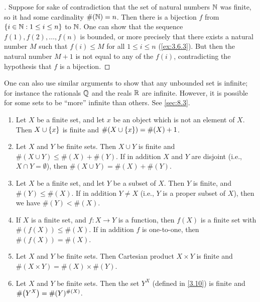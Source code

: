 \begin{proof}[]
	Suppose for sake of contradiction that the set of natural numbers \(\mathbb{N}\) was finite, so it had some cardinality \(\#(\mathbb{N}) = n\).
	Then there is a bijection \(f\) from \(\left\lbrace i \in \mathbb{N} : 1 \leq i \leq n\right\rbrace\) to \(\mathbb{N}\).
	One can show that the sequence \(f(1), f(2), \dots, f(n)\) is bounded, or more precisely that there exists a natural number \(M\) such that \(f(i) \leq M\) for all \(1 \leq i \leq n\) (\cref{ex:3.6.3}).
	But then the natural number \(M+1\) is not equal to any of the \(f(i)\), contradicting the hypothesis that \(f\) is a bijection.
\end{proof}

\begin{rmk}\label{3.6.13}
	One can also use similar arguments to show that any unbounded set is infinite;
	for instance the rationals \(\mathbb{Q}\) and the reals \(\mathbb{R}\) are infinite.
	However, it is possible for some sets to be ``more'' infinite than others.
	See \cref{sec:8.3}.
\end{rmk}

\begin{prop}\label{3.6.14}
	\begin{enumerate}
		\item Let \(X\) be a finite set, and let \(x\) be an object which is not an element of \(X\).
		      Then \(X \cup \left\lbrace x\right\rbrace\) is finite and \(\#(X \cup \left\lbrace x\right\rbrace) = \#(X) + 1\).
		\item Let \(X\) and \(Y\) be finite sets.
		      Then \(X \cup Y\) is finite and \(\#(X \cup Y) \leq \#(X) + \#(Y)\).
		      If in addition \(X\) and \(Y\) are disjoint (i.e., \(X \cap Y = \emptyset\)), then \(\#(X \cup Y) = \#(X) + \#(Y)\).
		\item Let \(X\) be a finite set, and let \(Y\) be a subset of \(X\).
		      Then \(Y\) is finite, and \(\#(Y) \leq \#(X)\).
		      If in addition \(Y \neq X\) (i.e., \(Y\) is a proper subset of \(X\)), then we have \(\#(Y) < \#(X)\).
		\item If \(X\) is a finite set, and \(f : X \to Y\) is a function, then \(f(X)\) is a finite set with \(\#(f(X)) \leq \#(X)\).
		      If in addition \(f\) is one-to-one, then \(\#(f(X)) = \#(X)\).
		\item Let \(X\) and \(Y\) be finite sets.
		      Then Cartesian product \(X \times Y\) is finite and \(\#(X \times Y) = \#(X) \times \#(Y)\).
		\item Let \(X\) and \(Y\) be finite sets.
		      Then the set \(Y^X\) (defined in \cref{3.10}) is finite and \(\#\pa{Y^X} = \#(Y)^{\#(X)}\).
	\end{enumerate}
\end{prop}

